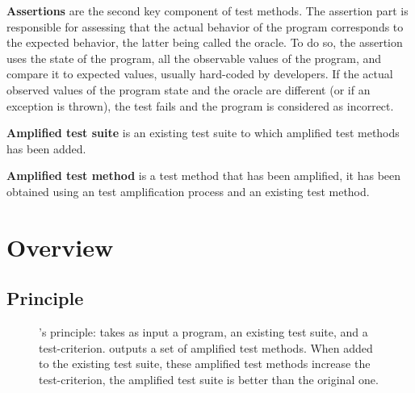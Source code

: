 \textbf{Assertions} are the second key component of test methods. 
The assertion part is responsible for assessing that the actual behavior of the program corresponds to the expected behavior, the latter being called the oracle.
To do so, the assertion uses the state of the program, \ie all the observable values of the program, and compare it to expected values, usually hard-coded by developers.
If the actual observed values of the program state and the oracle are different (or if an exception is thrown), the test fails and the program is considered as incorrect.

\textbf{Amplified test suite} is an existing test suite to which amplified test methods has been added.

\textbf{Amplified test method} is a test method that has been amplified, \ie it has been obtained using an test amplification process and an existing test method.

\section{Overview}
\label{sec:dspot:overview}

\subsection{Principle}
\label{subsec:dspot:overview:principle}

\begin{figure}[h]
	\centering
	\caption{
		\dspot's principle: \dspot takes as input a program, an existing test suite, and a test-criterion. 
		\dspot outputs a set of amplified test methods.
		When added to the existing test suite, these amplified test methods increase the test-criterion, \ie the amplified test suite is better than the original one.
	}
	\label{fig:dspot:principle}
\end{figure}

